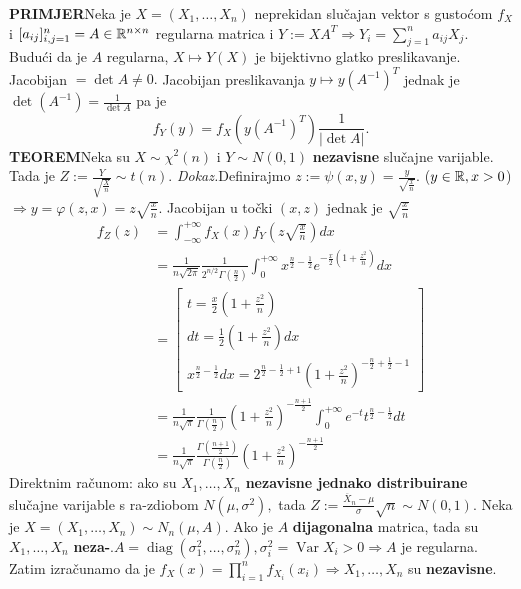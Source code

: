 \documentclass{article}
\newcommand{\Var}{\operatorname{Var}}
\newcommand{\diag}{\operatorname{diag}}
\begin{document}
\textbf{PRIMJER}\newline Neka je \(X=(X_1,\ldots,X_n)\) neprekidan slučajan vektor s gustoćom \(f_X\) i \([a_{ij}]_{i,j=1}^n=A\in\Bbb R^{n\times n}\) regularna matrica i \(Y:=XA^T\Rightarrow Y_i=\sum_{j=1}^na_{ij}X_j.\) Budući da je \(A\) regularna, \(X\mapsto Y(X)\) je bijektivno glatko preslikavanje. Jacobijan \(=\det A\ne 0.\) Jacobijan preslikavanja \(y\mapsto y(A^{-1})^T\) jednak je \(\det (A^{-1})=\frac1{\det A}\) pa je \[f_Y(y)=f_X\left(y(A^{-1})^T\right)\frac1{|\det A|}.\]
\textbf{TEOREM}\newline Neka su \(X\sim\chi^2(n)\) i \(Y\sim N(0,1)\) \textbf{nezavisne} slučajne varijable. Tada je \(Z:=\frac{Y}{\sqrt{\frac{X}n}}\sim t(n).\)\newline\newline
\textit{Dokaz.}\newline Definirajmo \(z:=\psi(x,y)=\frac{y}{\sqrt{\frac{x}n}}.\) (\(y\in\Bbb R,x>0\)) \(\Rightarrow y=\varphi(z,x)=z\sqrt{\frac{x}n}.\) Jacobijan u točki \((x,z)\) jednak je \(\sqrt{\frac{x}n}\) \[\begin{aligned}f_Z(z)&=\int_{-\infty}^{+\infty}f_X(x)f_Y\left(z\sqrt{\frac{x}n}\right)dx\\&=\frac1{n\sqrt{2\pi}}\frac1{2^{n/2}\Gamma\left(\frac{n}2\right)}\int_0^{+\infty}x^{\frac{n}2-\frac12}e^{-\frac{x}2\left(1+\frac{z^2}n\right)}dx\\&=\begin{bmatrix}t=\frac{x}2\left(1+\frac{z^2}n\right)\\dt=\frac12\left(1+\frac{z^2}n\right)dx\\x^{\frac{n}2-\frac12}dx=2^{\frac{n}2-\frac12+1}\left(1+\frac{z^2}n\right)^{-\frac{n}2+\frac12-1}\end{bmatrix}\\&=\frac1{n\sqrt\pi}\frac1{\Gamma\left(\frac{n}2\right)}\left(1+\frac{z^2}n\right)^{-\frac{n+1}2}\int_0^{+\infty}e^{-t}t^{\frac{n}2-\frac12}dt\\&=\frac1{n\sqrt\pi}\frac{\Gamma\left(\frac{n+1}2\right)}{\Gamma\left(\frac{n}2\right)}\left(1+\frac{z^2}n\right)^{-\frac{n+1}2}\end{aligned}\] Direktnim računom: ako su \(X_1,\ldots,X_n\) \textbf{nezavisne jednako distribuirane} slučajne varijable s ra-\newline zdiobom \(N\left(\mu,\sigma^2\right),\) tada \(Z:=\frac{\overline X_n-\mu}\sigma\sqrt n\sim N(0,1).\) \newline\newline Neka je \(X=(X_1,\ldots,X_n)\sim N_n(\mu,A).\) Ako je \(A\) \textbf{dijagonalna} matrica, tada su \(X_1,\ldots,X_n\) \textbf{neza-}\newline{}.\newline \(A=\diag\left(\sigma_1^2,\ldots,\sigma_n^2\right),\sigma_i^2=\Var X_i>0\Rightarrow A\) je regularna. Zatim izračunamo da je \(f_X(x)=\prod_{i=1}^n f_{X_i}(x_i)\Rightarrow X_1,\ldots,X_n\) su \textbf{nezavisne}.\newpage 
\end{document}
